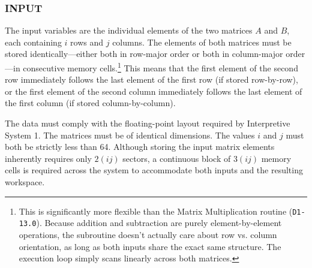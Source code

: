 \documentclass{article}
\begin{document}
\subsubsection*{INPUT}
The input variables are the individual elements of the two matrices $A$ and $B$, each containing $i$ rows and $j$ columns. The elements of both matrices must be stored identically—either both in row-major order or both in column-major order—in consecutive memory cells.\footnote{This is significantly more flexible than the Matrix Multiplication routine (\texttt{D1-13.0}). Because addition and subtraction are purely element-by-element operations, the subroutine doesn't actually care about row vs. column orientation, as long as both inputs share the exact same structure. The execution loop simply scans linearly across both matrices.} This means that the first element of the second row immediately follows the last element of the first row (if stored row-by-row), or the first element of the second column immediately follows the last element of the first column (if stored column-by-column).

\noindent
The data must comply with the floating-point layout required by Interpretive System 1. The matrices must be of identical dimensions. The values $i$ and $j$ must both be strictly less than 64. Although storing the input matrix elements inherently requires only $2(ij)$ sectors, a continuous block of $3(ij)$ memory cells is required across the system to accommodate both inputs and the resulting workspace.
\end{document}
